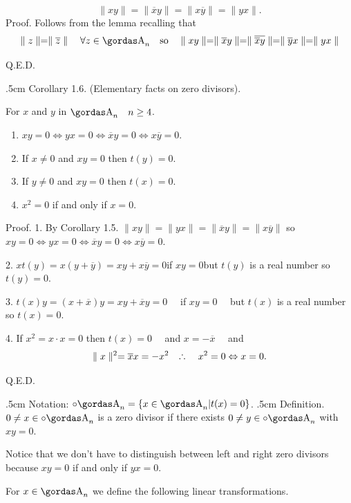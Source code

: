 $$\parallel xy\parallel=\parallel\overline{x}y\parallel=
\parallel x\overline{y}\parallel=\parallel yx\parallel.$$
{\bsbf Proof.} Follows from the lemma recalling that 
$$\parallel z\parallel = \parallel\overline{z}\parallel\quad\forall 
z\in \a_{n}\quad
\hbox{\bs so}\quad
\parallel xy\parallel=\parallel\overline{x}y\parallel
=\parallel \overline{\overline{x}y}
\parallel=\parallel \overline{y}x\parallel=
\parallel yx\parallel$$
\begin{flushright}
Q.E.D.
\end{flushright}
\vglue.5cm
\noindent
{\bsbf Corollary 1.6.} (Elementary facts on zero divisors).
\par 
For $x$ and $y$ in $\a_{n}\quad n\ge 4$.
\par 
\begin{enumerate}
\item $xy=0 \Leftrightarrow yx=0\Leftrightarrow\overline{x}y=0
\Leftrightarrow x\overline{y}=0$.
\item If $x\neq 0$ and $xy=0$ then $t(y)=0$.
\item If $y\neq 0$ and $xy=0$ then $t(x)=0$.
\item $x^{2}=0$ if and only if $x=0$.
\end{enumerate}
{\bsbf Proof. } 1. By Corollary 1.5. 
$\parallel xy\parallel=\parallel yx\parallel=\parallel\overline{x}y\parallel
=\parallel x\overline{y}\parallel$ so
$xy=0\Leftrightarrow yx=0\Leftrightarrow\overline{x}y=0\Leftrightarrow x
\overline{y}=0$.
\par 
2. $xt(y)=x(y+\overline{y})=xy+x\overline{y}=0$\quad if $xy=0$\quad but $t(y)$
is a real number so $t(y)=0$.
\par 
3. $t(x)y=(x+\overline{x})y=xy+\overline{x}y=0\quad$ if $xy=0\quad$ 
but $t(x)$ is
a real number so $t(x)=0$.
\par 
4. If $x^{2}=x\cdot x=0$ then $t(x)=0\quad$ and $x=-\overline{x}\quad$ and 
$$\parallel x\parallel^{2}=\overline{x}x=-x^{2}\quad\triangulo\quad 
x^{2}=0\Leftrightarrow x=0.$$
\begin{flushright}
Q.E.D.
\end{flushright}
\vglue.5cm
\noindent
{\bsbf Notation:} $\circ{\a}_{n}=\{x\in \a_{n}|t(x)=0\}$.
\vglue.5cm
\noindent
{\bsbf Definition.} $0\neq x\in \circ{\a}_{n}$ is a zero divisor if there exists 
$0\neq y \in \circ{\a}_{n}$ with $xy=0$.
\par 
Notice that we don't have to distinguish between left and right zero divisors 
because $xy=0$ if and only if $yx=0$.
\par 
For $x\in \a_{n}$ we define the following linear transformations.
